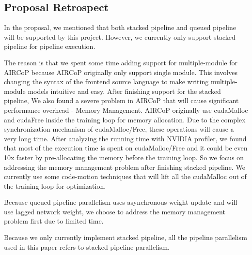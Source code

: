 \documentclass[sigplan]{acmart}\settopmatter{printfolios=true,printccs=false,printacmref=false}
\begin{document}
\subsection{Proposal Retrospect}
In the proposal, we mentioned that both stacked pipeline and queued pipeline will be supported by this project. However, we currently only support stacked pipeline for pipeline execution.\par
The reason is that we spent some time adding support for multiple-module for AIRCoP because AIRCoP originally only support single module. This involves changing the syntax of the frontend source language to make writing multiple-module models intuitive and easy. After finishing support for the stacked pipeline, We also found a severe problem in AIRCoP that will cause significant performance overhead - Memory Management. AIRCoP originally use cudaMalloc and cudaFree inside the training loop for memory allocation. Due to the complex synchronization mechanism of cudaMalloc/Free, these operations will cause a very long time. After analyzing the running time with NVIDIA profiler, we found that most of the execution time is spent on cudaMalloc/Free and it could be even 10x faster by pre-allocating the memory before the training loop. So we focus on addressing the memory management problem after finishing stacked pipeline. We currently use some code-motion techniques that will lift all the cudaMalloc out of the training loop for optimization.\par
Because queued pipeline parallelism uses asynchronous weight update and will use lagged network weight, we choose to address the memory management problem first due to limited time.\par
Because we only currently implement stacked pipeline, all the pipeline parallelism used in this paper refers to stacked pipeline parallelism.
\end{document}
